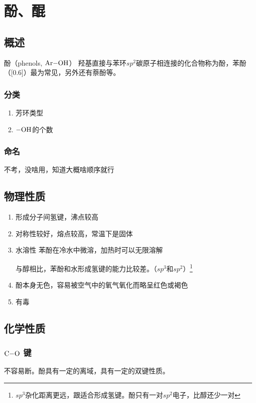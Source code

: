 \documentclass[a4paper]{ctexrep}
\begin{document}
    \chapter{酚、醌}
    \section{概述}
    酚（phenols, $\ce{Ar-OH}$）
    羟基直接与苯环\textit{$sp^2$}碳原子相连接的化合物称为酚，苯酚（\scalebox{0.6}[0.6]{}）最为常见，另外还有萘酚等。
    
    \subsection{分类}
    \begin{enumerate}
        \item 芳环类型
        \item $\ce{-OH}$的个数
    \end{enumerate}
    \subsection{命名}
    不考，没啥用，知道大概啥顺序就行

    \section{物理性质}
    \begin{enumerate}
        \item 形成分子间氢键，沸点较高
        \item 对称性较好，熔点较高，常温下是固体
        \item 水溶性 苯酚在冷水中微溶，加热时可以无限溶解 \par
        与醇相比，苯酚和水形成氢键的能力比较差。（$sp^3$和$sp^2$）\footnote{$sp^3$杂化距离更远，跟适合形成氢键。酚只有一对$sp^2$电子，比醇还少一对}
        \item 酚本身无色，容易被空气中的氧气氧化而略呈红色或褐色
        \item 有毒
    \end{enumerate}

    \section{化学性质}
    \subsection{$\ce{C-O}$ 键}
    不容易断。酚具有一定的离域，具有一定的双键性质。
\end{document}
